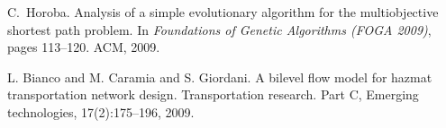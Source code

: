 \documentclass[preprint,12pt]{elsarticle}
\begin{document}
\begin{thebibliography}{00}
C.~Horoba.
\newblock Analysis of a simple evolutionary algorithm for the multiobjective
  shortest path problem.
\newblock In \emph{Foundations of Genetic Algorithms {(FOGA 2009)}}, pages
  113--120. ACM, 2009. 

L. Bianco and M. Caramia and S. Giordani.
\newblock A bilevel flow model for hazmat transportation network design.
\newblock Transportation research. Part C, Emerging technologies, 17(2):175--196, 2009.



% 


\end{thebibliography}
\end{document}
